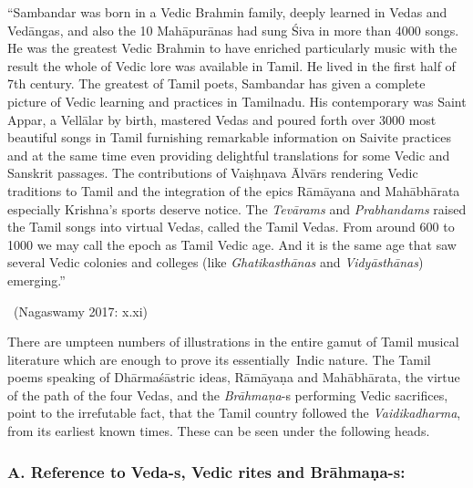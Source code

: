 \begin{myquote}
“Sambandar was born in a Vedic Brahmin family, deeply learned in Vedas and Vedāngas, and also the 10 Mahāpurānas had sung Śiva in more than 4000 songs. He was the greatest Vedic Brahmin to have enriched particularly music with the result the whole of Vedic lore was available in Tamil. He lived in the first half of 7th century. The greatest of Tamil poets, Sambandar has given a complete picture of Vedic learning and practices in Tamilnadu. His contemporary was Saint Appar, a Vellālar by birth, mastered Vedas and poured forth over 3000 most beautiful songs in Tamil furnishing remarkable information on Saivite practices and at the same time even providing delightful translations for some Vedic and Sanskrit passages. The contributions of Vaiṣhṇava Ālvārs rendering Vedic traditions to Tamil and the integration of the epics Rāmāyana and Mahābhārata especially Krishna’s sports deserve notice. The \textit{Tevārams} and \textit{Prabhandams} raised the Tamil songs into virtual Vedas, called the Tamil Vedas. From around 600 to 1000 we may call the epoch as Tamil Vedic age. And it is the same age that saw several Vedic colonies and colleges (like \textit{Ghatikasthānas} and \textit{Vidyāsthānas}) emerging.”

~\hfill (Nagaswamy 2017: x.xi)
\end{myquote}

There are umpteen numbers of illustrations in the entire gamut of Tamil musical literature which are enough to prove its essentially~Indic nature. The Tamil poems speaking of Dhārmaśāstric ideas, Rāmā\-yaṇa and Mahābhārata, the virtue of the path of the four Vedas, and the \textit{Brāhmaṇa}-s performing Vedic sacrifices, point to the irrefutable fact, that the Tamil country followed the \textit{Vaidikadharma}, from its earliest known times. These can be seen under the following heads.

\subsubsection*{A. Reference to Veda-s, Vedic rites and Brāhmaṇa-s:}

